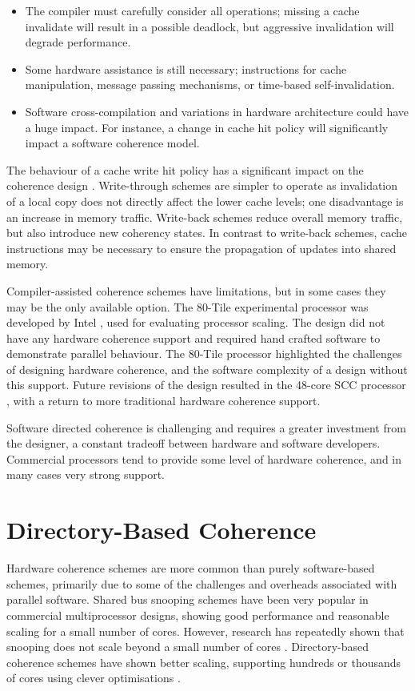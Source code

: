 		\begin{itemize}
			\item The compiler must carefully consider all operations; missing a cache invalidate will result in a possible deadlock, but aggressive invalidation will degrade performance.
			\item Some hardware assistance is still necessary; instructions for cache manipulation, message passing mechanisms, or time-based self-invalidation.
			\item Software cross-compilation and variations in hardware architecture could have a huge impact. For instance, a change in cache hit policy will significantly impact a software coherence model.
		\end{itemize}
		
		The behaviour of a cache write hit policy has a significant impact on the coherence design \cite{Smith82,Jouppi91_1,Chen92}. Write-through schemes are simpler to operate as invalidation of a local copy does not directly affect the lower cache levels; one disadvantage is an increase in memory traffic. Write-back schemes reduce overall memory traffic, but also introduce new coherency states. In contrast to write-back schemes, cache instructions may be necessary to ensure the propagation of updates into shared memory.
		
		Compiler-assisted coherence schemes have limitations, but in some cases they may be the only available option.
		The 80-Tile experimental processor was developed by Intel \cite{Vangal08,Mattson08}, used for evaluating processor scaling. The design did not have any hardware coherence support and required hand crafted software to demonstrate parallel behaviour. 
		The 80-Tile processor highlighted the challenges of designing hardware coherence, and the software complexity of a design without this support. 
		Future revisions of the design resulted in the 48-core SCC processor \cite{Mattson10}, with a return to more traditional hardware coherence support.
	
		Software directed coherence is challenging and requires a greater investment from the designer, a constant tradeoff between hardware and software developers. Commercial processors tend to provide some level of hardware coherence, and in many cases very strong support. 

	\section{Directory-Based Coherence}
		Hardware coherence schemes are more common than purely software-based schemes, primarily due to some of the challenges and overheads associated with parallel software. Shared bus snooping schemes have been very popular in commercial multiprocessor designs, showing good performance and reasonable scaling for a small number of cores. 
		However, research has repeatedly shown that snooping does not scale beyond a small number of cores \cite{Hennessy06}. Directory-based coherence schemes have shown better scaling, supporting hundreds or thousands of cores using clever optimisations \cite{Martin12,Sanchez12}. 
		
